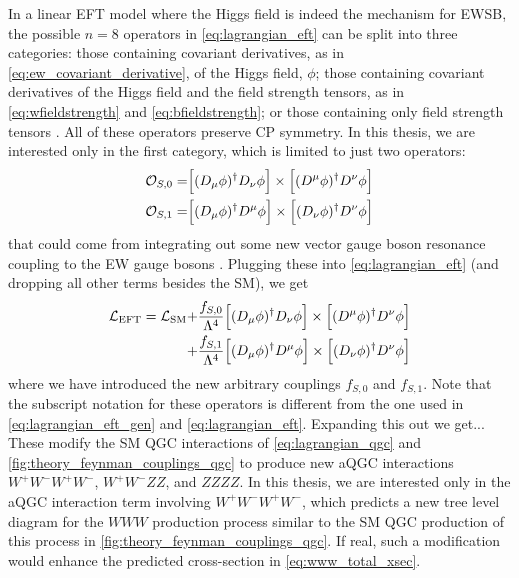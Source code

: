 
In a linear EFT model where the Higgs field is indeed the mechanism for EWSB, 
the possible $n=8$ operators 
in \eqn\eqref{eq:lagrangian_eft} can
be split into three categories: those containing covariant derivatives,
as in \eqn\eqref{eq:ew_covariant_derivative}, of the Higgs field, $\phi$; 
those containing covariant derivatives of the Higgs field and 
the field strength tensors, as 
in \eqn\eqref{eq:wfieldstrength} and \eqref{eq:bfieldstrength};
or those containing only field strength tensors \cite{Eboli:2006wa,Eboli:2003nq}. 
All of these operators preserve CP symmetry.
In this thesis, we are
interested only in the first category, which is limited to just two operators:
\begin{align}
\mathcal{O}_{S,0} =& \Big[(D_{\mu}\phi)^{\dagger} D_{\nu} \phi\Big] \times \Big[(D^{\mu} \phi)^{\dagger} D^{\nu} \phi \Big] \\
\mathcal{O}_{S,1} =& \Big[(D_{\mu}\phi)^{\dagger} D^{\mu} \phi\Big] \times \Big[(D_{\nu} \phi)^{\dagger} D^{\nu} \phi \Big]
\end{align}
that could come from integrating out some new 
vector gauge boson resonance coupling to the EW gauge bosons \cite{Baak:2013fwa}.
Plugging these into \eqn\eqref{eq:lagrangian_eft} (and dropping all other terms
besides the SM), we get
\begin{equation}
\begin{aligned}
\mathcal{L}_{\textrm{EFT}} = \mathcal{L}_{\textrm{SM}} +&
\frac{f_{S,0}}{\Lambda^4}\Big[(D_{\mu}\phi)^{\dagger} D_{\nu} \phi\Big] \times \Big[(D^{\mu} \phi)^{\dagger} D^{\nu} \phi \Big] \\
+& \frac{f_{S,1}}{\Lambda^4}\Big[(D_{\mu}\phi)^{\dagger} D^{\mu} \phi\Big] \times \Big[(D_{\nu} \phi)^{\dagger} D^{\nu} \phi \Big]
\end{aligned}
\label{eq:lagrangian_aqgc}
\end{equation}
where we have introduced the new arbitrary couplings $f_{S,0}$ and $f_{S,1}$.
Note that the subscript notation for these operators is different 
from the one used in \eqn\eqref{eq:lagrangian_eft_gen} and \eqn\eqref{eq:lagrangian_eft}.
Expanding this out we get...
These modify the SM QGC interactions of \eqn\eqref{eq:lagrangian_qgc}
and \fig\ref{fig:theory_feynman_couplings_qgc}
to produce new aQGC interactions $W^+W^-W^+W^-$, $W^+W^-ZZ$, and $ZZZZ$.
In this thesis, we are interested only in the aQGC
interaction term involving $W^+W^-W^+W^-$, which predicts  
a new tree level diagram for the $WWW$ production process similar to the SM QGC
production of this process in \fig\ref{fig:theory_feynman_couplings_qgc}.
If real, such a modification would enhance the predicted 
cross-section in \eqn\eqref{eq:www_total_xsec}.

